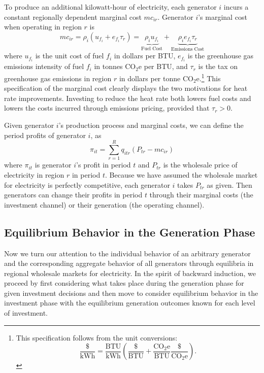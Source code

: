 To produce an additional kilowatt-hour of electricity, each generator $i$ incurs a constant regionally dependent marginal cost $mc_{ir}$. Generator $i$'s marginal cost when operating in region $r$ is
\begin{equation}
    mc_{ir} = \rho_i(u_{f_i} + e_{f_i} \tau_r) = \underbrace{\rho_i u_{f_i}}_{\text{Fuel Cost}} + \underbrace{\rho_i e_{f_i} \tau_r}_{\text{Emissions Cost}}
\end{equation}
where $u_{f_i}$ is the unit cost of fuel $f_i$ in dollars per BTU, $e_{f_i}$ is the greenhouse gas emissions intensity of fuel $f_i$ in tonnes CO$_2$e per BTU, and $\tau_r$ is the tax on greenhouse gas emissions in region $r$ in dollars per tonne CO$_2$e.\footnote{This specification follows from the unit conversions:
    $$\frac{\$}{\text{kWh}} = \frac{\text{BTU}}{\text{kWh}}\left( \frac{\$}{\text{BTU}} + \frac{\text{CO}_2\text{e}}{\text{BTU}} \frac{\$}{\text{CO}_2\text{e}}\right).$$
}
This specification of the marginal cost clearly displays the two motivations for heat rate improvements. Investing to reduce the heat rate both lowers fuel costs and lowers the costs incurred through emissions pricing, provided that $\tau_r > 0$. 

Given generator $i$'s production process and marginal costs, we can define the period profits of generator $i$, as
\begin{equation}\label{per_pi}
    \pi_{it} = \sum_{r = 1}^R q_{itr} (P_{tr} - mc_{ir})
\end{equation}
where $\pi_{it}$ is generator $i$'s profit in period $t$ and $P_{tr}$ is the wholesale price of electricity in region $r$ in period $t$. Because we have assumed the wholesale market for electricity is perfectly competitive, each generator $i$ takes $P_{tr}$ as given. Then generators can change their profits in period $t$ through their marginal costs (the investment channel) or their generation (the operating channel).


\subsection{Equilibrium Behavior in the Generation Phase}

Now we turn our attention to the individual behavior of an arbitrary generator and the corresponding aggregate behavior of all generators through equilibria in regional wholesale markets for electricity. In the spirit of backward induction, we proceed by first considering what takes place during the generation phase for given investment decisions and then move to consider equilibrium behavior in the investment phase with the equilibrium generation outcomes known for each level of investment.

